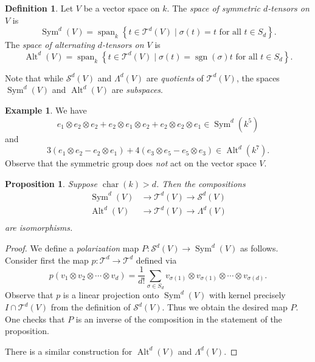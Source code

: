 \documentclass[12pt]{article}
\theoremstyle{plain}
\newtheorem{proposition}[theorem]{Proposition}
\theoremstyle{definition}
\newtheorem{definition}[theorem]{Definition}
\newtheorem{example}[theorem]{Example}
\theoremstyle{remark}
\numberwithin{equation}{section}
\begin{document}
\begin{definition}
Let $V$ be a vector space on $k$.
The \emph{space of symmetric $d$-tensors on $V$} is
\[
\operatorname{Sym}^d(V) = \operatorname{span}_k
\left\{ t \in \mathcal{T}^d(V) \mid \sigma(t)=t
\textrm{ for all } t \in S_d  \right\} .
\]
The \emph{space of alternating $d$-tensors on $V$} is
\[
\operatorname{Alt}^d(V) = \operatorname{span}_k
\left\{ t \in \mathcal{T}^d(V) \mid
\sigma(t)=\operatorname{sgn}(\sigma)t
\textrm{ for all } t \in S_d  \right\} .
\]
\end{definition}

Note that while $\mathcal{S}^d(V)$ and $\Lambda^d(V)$ are
\emph{quotients} of $\mathcal{T}^d(V)$,
the spaces $\operatorname{Sym}^d(V)$
and $\operatorname{Alt}^d(V)$
are \emph{subspaces}.

\begin{example}
We have
\[
e_1 \otimes e_2 \otimes e_2 + e_2 \otimes e_1 \otimes e_2
+ e_2 \otimes e_2 \otimes e_1 \in \operatorname{Sym}^d(k^5)
\]
and
\[
3\left(e_1 \otimes e_2 - e_2 \otimes e_1\right)
+ 4\left( e_3 \otimes e_5 - e_5 \otimes e_3 \right) 
\in \operatorname{Alt}^d(k^7).
\]
Observe that the symmetric group does \emph{not} act on the
vector space $V$.
\end{example}

\begin{proposition}
Suppose $\operatorname{char}(k) > d$.  Then the compositions
\begin{align*}
\operatorname{Sym}^d(V) &\to \mathcal{T}^d(V) \to \mathcal{S}^d(V)\\
\operatorname{Alt}^d(V) &\to \mathcal{T}^d(V) \to \Lambda^d(V)\\
\end{align*}
are isomorphisms.
\end{proposition}

\begin{proof}
We define a \emph{polarization} map
$P : \mathcal{S}^d(V) \to \operatorname{Sym}^d(V)$ as follows.
Consider first the map $p : \mathcal{T}^d \to \mathcal{T}^d$
defined via
\[
p(v_1 \otimes v_2 \otimes \cdots \otimes v_d)
= \frac{1}{d!}\sum_{\sigma \in S_d}
v_{\sigma(1)} \otimes v_{\sigma(1)} \otimes \cdots \otimes v_{\sigma(d)}
.
\]
Observe that $p$ is a linear projection onto $\operatorname{Sym}^d(V)$
with kernel precisely $I \cap \mathcal{T}^d(V)$ from the definition
of $\mathcal{S}^d(V)$.  Thus we obtain the desired map $P$.
One checks that $P$ is an inverse of the composition in the statement of
the proposition.

There is a similar construction for $\operatorname{Alt}^d(V)$
and $\Lambda^d(V)$.
\end{proof}
\end{document}
